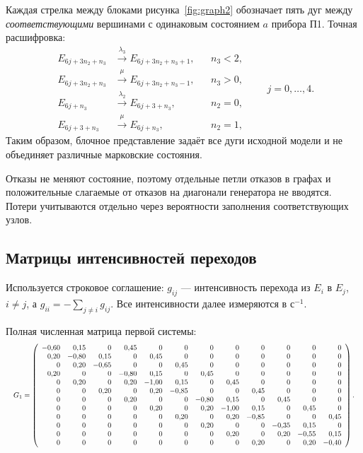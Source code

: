 \documentclass[a4paper,12pt]{article}
\begin{document}
Каждая стрелка между блоками рисунка~\ref{fig:graph2} обозначает пять дуг между \emph{соответствующими} вершинами с одинаковым состоянием $a$ прибора П1. Точная расшифровка:
\[
\begin{aligned}
E_{6j+3n_2+n_3}&\xrightarrow{\lambda_3}E_{6j+3n_2+n_3+1},&& n_3<2,\\
E_{6j+3n_2+n_3}&\xrightarrow{\mu}E_{6j+3n_2+n_3-1},&& n_3>0,\\
E_{6j+n_3}&\xrightarrow{\lambda_2}E_{6j+3+n_3},&& n_2=0,\\
E_{6j+3+n_3}&\xrightarrow{\mu}E_{6j+n_3},&& n_2=1,
\end{aligned}\qquad j=0,\ldots,4.
\]
Таким образом, блочное представление задаёт все дуги исходной модели и не объединяет различные марковские состояния.

Отказы не меняют состояние, поэтому отдельные петли отказов в графах и положительные слагаемые от отказов на диагонали генератора не вводятся. Потери учитываются отдельно через вероятности заполнения соответствующих узлов.

\subsection{Матрицы интенсивностей переходов}
Используется строковое соглашение: $g_{ij}$ --- интенсивность перехода из $E_i$ в $E_j$, $i\ne j$, а $g_{ii}=-\sum_{j\ne i}g_{ij}$. Все интенсивности далее измеряются в $\text{с}^{-1}$.

Полная численная матрица первой системы:
\begin{equation}\label{eq:q1}
\resizebox{\linewidth}{!}{$G_1=\left(\begin{array}{rrrrrrrrrrrr}
-0{,}60 & 0{,}15 & 0 & 0{,}45 & 0 & 0 & 0 & 0 & 0 & 0 & 0 & 0 \\0{,}20 & -0{,}80 & 0{,}15 & 0 & 0{,}45 & 0 & 0 & 0 & 0 & 0 & 0 & 0 \\0 & 0{,}20 & -0{,}65 & 0 & 0 & 0{,}45 & 0 & 0 & 0 & 0 & 0 & 0 \\0{,}20 & 0 & 0 & -0{,}80 & 0{,}15 & 0 & 0{,}45 & 0 & 0 & 0 & 0 & 0 \\0 & 0{,}20 & 0 & 0{,}20 & -1{,}00 & 0{,}15 & 0 & 0{,}45 & 0 & 0 & 0 & 0 \\0 & 0 & 0{,}20 & 0 & 0{,}20 & -0{,}85 & 0 & 0 & 0{,}45 & 0 & 0 & 0 \\0 & 0 & 0 & 0{,}20 & 0 & 0 & -0{,}80 & 0{,}15 & 0 & 0{,}45 & 0 & 0 \\0 & 0 & 0 & 0 & 0{,}20 & 0 & 0{,}20 & -1{,}00 & 0{,}15 & 0 & 0{,}45 & 0 \\0 & 0 & 0 & 0 & 0 & 0{,}20 & 0 & 0{,}20 & -0{,}85 & 0 & 0 & 0{,}45 \\0 & 0 & 0 & 0 & 0 & 0 & 0{,}20 & 0 & 0 & -0{,}35 & 0{,}15 & 0 \\0 & 0 & 0 & 0 & 0 & 0 & 0 & 0{,}20 & 0 & 0{,}20 & -0{,}55 & 0{,}15 \\0 & 0 & 0 & 0 & 0 & 0 & 0 & 0 & 0{,}20 & 0 & 0{,}20 & -0{,}40
\end{array}\right).$}
\end{equation}
\end{document}
